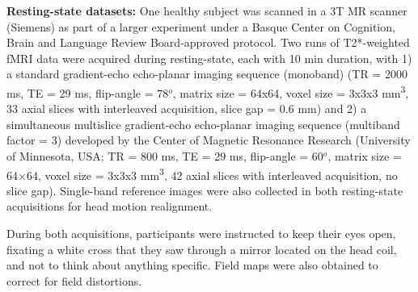 \textbf{Resting-state datasets:} One healthy subject was scanned in a 3T MR scanner (Siemens) as part of a larger experiment under a Basque Center on Cognition, Brain and Language Review Board-approved protocol. Two runs of T2*-weighted fMRI data were acquired during resting-state, each with 10 min duration, with 1) a standard gradient-echo echo-planar imaging sequence (monoband) (TR = 2000 ms, TE = 29 ms, flip-angle = 78\(^o\), matrix size = 64x64, voxel size = 3x3x3 mm\textsuperscript{3}, 33 axial slices with interleaved acquisition, slice gap = 0.6 mm) and 2) a simultaneous multislice gradient-echo echo-planar imaging sequence (multiband factor = 3) developed by the Center of Magnetic Resonance Research (University of Minnesota, USA; TR = 800 ms, TE = 29 ms, flip-angle = 60\(^o\), matrix size = 64×64, voxel size = 3x3x3 mm\textsuperscript{3}, 42 axial slices with interleaved acquisition, no slice gap). Single-band reference images were also collected in both resting-state acquisitions for head motion realignment.

During both acquisitions, participants were instructed to keep their eyes open, fixating a white cross that they saw through a mirror located on the head coil, and not to think about anything specific. Field maps were also obtained to correct for field distortions.